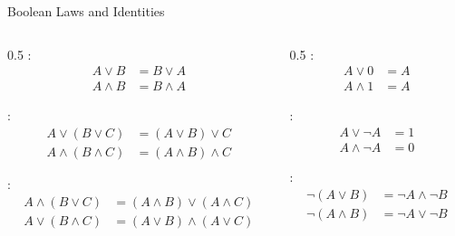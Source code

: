 \begin{frame}{Boolean Laws and Identities}
\begin{columns}
\begin{column}{0.5\textwidth}
:
\begin{align}
A \lor B &= B \lor A\\
A \land B &= B \land A
\end{align}

:
\begin{align}
A \lor (B \lor C) &= (A \lor B) \lor C\\
A \land (B \land C) &= (A \land B) \land C
\end{align}

:
\begin{align}
A \land (B \lor C) &= (A \land B) \lor (A \land C)\\
A \lor (B \land C) &= (A \lor B) \land (A \lor C)
\end{align}
\end{column}
\begin{column}{0.5\textwidth}
:
\begin{align}
A \lor 0 &= A\\
A \land 1 &= A
\end{align}

:
\begin{align}
A \lor \neg A &= 1\\
A \land \neg A &= 0
\end{align}

:
\begin{align}
\neg(A \lor B) &= \neg A \land \neg B\\
\neg(A \land B) &= \neg A \lor \neg B
\end{align}
\end{column}
\end{columns}
\end{frame}

